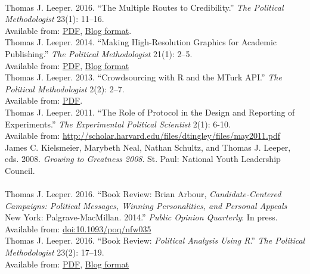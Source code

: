 \documentclass[12pt]{article}
\newcommand{\topic}[1]{\pagebreak[3]\indent {\color{lg}{\footnotesize #1 }}\\}
\newcommand{\entry}[1]{\indent {\color{lg}\guillemotright}\hspace{2pt}#1\vspace{.25em}\\}
\begin{document}
\topic{Other Academic Publications}
    \entry{Thomas J. Leeper. 2016. ``The Multiple Routes to Credibility.'' \textit{The Political Methodologist} 23(1): 11--16.\\ Available from: \href{https://thepoliticalmethodologist.files.wordpress.com/2016/02/tpm_v23_n1.pdf}{PDF}, \href{https://thepoliticalmethodologist.com/2015/12/21/the-multiple-routes-to-credibility/}{Blog format}.}
	\entry{Thomas J. Leeper. 2014. ``Making High-Resolution Graphics for Academic Publishing.'' \textit{The Political Methodologist} 21(1): 2--5.\\ Available from: \href{https://thepoliticalmethodologist.files.wordpress.com/2014/06/tpm_v21_n12.pdf}{PDF}, \href{https://thepoliticalmethodologist.com/2013/11/25/making-high-resolution-graphics-for-academic-publishing/}{Blog format}}
	\entry{Thomas J. Leeper. 2013. ``Crowdsourcing with R and the MTurk API.'' \textit{The Political Methodologist} 2(2): 2--7.\\ Available from: \href{https://thepoliticalmethodologist.files.wordpress.com/2013/09/tpm_v20_n21.pdf}{PDF}.}
	\entry{Thomas J. Leeper. 2011. ``The Role of Protocol in the Design and Reporting of Experiments.'' \textit{The Experimental Political Scientist} 2(1): 6-10.\\ Available from: \url{http://scholar.harvard.edu/files/dtingley/files/may2011.pdf}}
	\entry{James C. Kielsmeier, Marybeth Neal, Nathan Schultz, and Thomas J. Leeper, eds. 2008. \textit{Growing to Greatness 2008}. St. Paul: National Youth Leadership Council.}

\topic{Book Reviews}
	\entry{Thomas J. Leeper. 2016. ``Book Review: Brian Arbour, \textit{Candidate-Centered Campaigns: Political Messages, Winning Personalities, and Personal Appeals} New York: Palgrave-MacMillan. 2014.'' \textit{Public Opinion Quarterly}: In press. Available from: \href{http://doi.org/10.1093/poq/nfw035}{doi:10.1093/poq/nfw035}}
	\entry{Thomas J. Leeper. 2016. ``Book Review: \textit{Political Analysis Using R}.'' \textit{The Political Methodologist} 23(2): 17--19.\\ Available from: \href{https://thepoliticalmethodologist.files.wordpress.com/2016/08/tpm_v23_n2.pdf}{PDF}, \href{https://thepoliticalmethodologist.com/2016/05/25/book-review-political-analysis-using-r/}{Blog format}}
\end{document}
